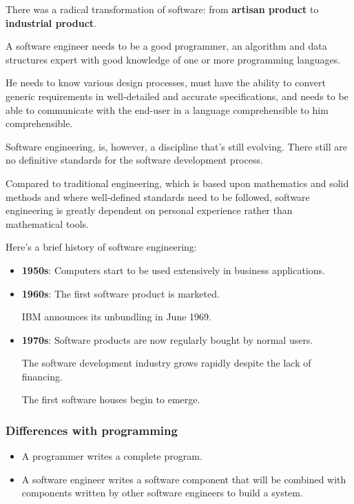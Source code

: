 \documentclass[12pt]{report}
\renewcommand\emph{\textbf}
\begin{document}
                        There was a radical transformation of software: from \emph{artisan product} to \emph{industrial product}.

                        A software engineer needs to be a good programmer, an algorithm and data structures expert with good knowledge of one or more programming languages.

                        He needs to know various design processes, must have the ability to convert generic requirements in well-detailed and accurate specifications, and needs to be able to communicate with the end-user in a language comprehensible to him comprehensible.

                        Software engineering, is, however, a discipline that's still evolving. There still are no definitive standards for the software development process.

                        Compared to traditional engineering, which is based upon mathematics and solid methods and where well-defined standards need to be followed, software engineering is greatly dependent on personal experience rather than mathematical tools.

                        Here's a brief history of software engineering:

                        \begin{itemize}
                            \item \emph{1950s}: Computers start to be used extensively in business applications.
                            \item \emph{1960s}: The first software product is marketed. 

                            IBM announces its unbundling in June 1969.
                            \item \emph{1970s}: Software products are now regularly bought by normal users. 

                            The software development industry grows rapidly despite the lack of financing.

                            The first software houses begin to emerge.
                        \end{itemize}

                    \subsubsection{Differences with programming}

                        \begin{itemize}
                            \item A programmer writes a complete program.
                            \item A software engineer writes a software component that will be combined with components written by other software engineers to build a system.
                        \end{itemize}
\end{document}
